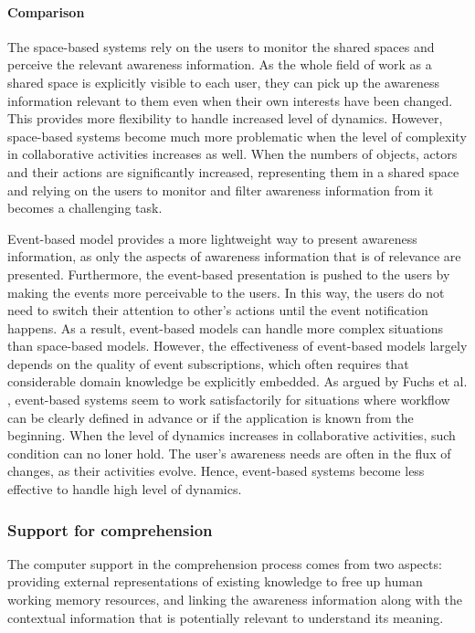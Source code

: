 \paragraph*{Comparison} %
\label{par:comparison}
The space-based systems rely on the users to monitor the shared spaces and perceive the relevant awareness information. As the whole field of work as a shared space is explicitly visible to each user, they can pick up the awareness information relevant to them even when their own interests have been changed. This provides more flexibility to handle increased level of dynamics. However, space-based systems become much more problematic when the level of complexity in collaborative activities increases as well. When the numbers of objects, actors and their actions are significantly increased, representing them in a shared space and relying on the users to monitor and filter awareness information from it becomes a challenging task.

Event-based model provides a more lightweight way to present awareness information, as only the aspects of awareness information that is of relevance are presented. Furthermore, the event-based presentation is pushed to the users by making the events more perceivable to the users. In this way, the users do not need to switch their attention to other's actions until the event notification happens. As a result, event-based models can handle more complex situations than space-based models. However, the effectiveness of event-based models largely depends on the quality of event subscriptions, which often requires that considerable domain knowledge be explicitly embedded. As argued by Fuchs et al. \cite{fuchs1999a}, event-based systems seem to work satisfactorily for situations where workflow can be clearly defined in advance or if the application is known from the beginning. When the level of dynamics increases in collaborative activities, such condition can no loner hold. The user's awareness needs are often in the flux of changes, as their activities evolve. Hence, event-based systems become less effective to handle high level of dynamics.

\subsubsection{Support for comprehension} %
\label{ssub:support_for_comprehension}
The computer support in the comprehension process comes from two aspects: providing external representations of existing knowledge to free up human working memory resources, and linking the awareness information along with the contextual information that is potentially relevant to understand its meaning.

